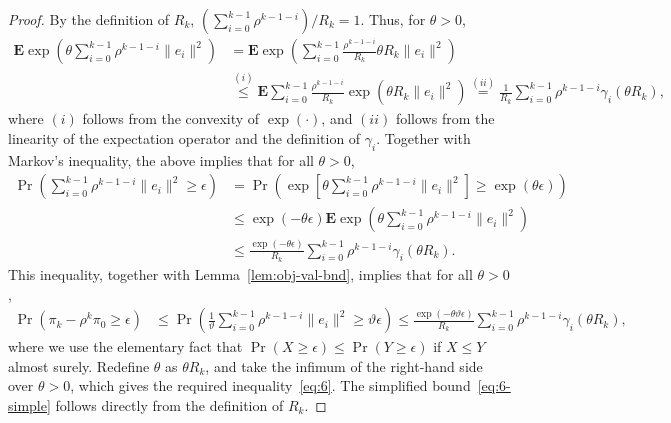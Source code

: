 \begin{proof}
  By the definition of $R_{k}$, $\left(\sum_{i=0}^{k-1}
    \rho^{k-1-i}\right)/{R_k}=1$. Thus, for $\theta>0$,
  \begin{align*}
    \mathbf{E}
        \exp\left(
              \theta\sum_{i=0}^{k-1}\rho^{k-1-i}\|e_i\|^2
            \right)
     &=
    \mathbf{E}
        \exp\left(
              \sum_{i=0}^{k-1}
              \frac{\rho^{k-1-i}}{R_k}\theta R_k\|e_i\|^2
            \right)
\\  &\overset{(i)}\le
    \mathbf{E}
        \sum_{i=0}^{k-1}\frac{\rho^{k-1-i}}{R_k}
        \exp(\theta R_k\|e_i\|^2)
 \overset{(ii)}=
    \frac{1}{R_k}\sum_{i=0}^{k-1}\rho^{k-1-i}\gamma_i(\theta R_k),
  \end{align*}
  where $(i)$ follows from the convexity of $\exp(\cdot)$, and $(ii)$
  follows from the linearity of the expectation operator and the
  definition of $\gamma_i$. Together with Markov's inequality, the above
  implies that for all $\theta>0$,
  \begin{align}
    \Pr\left(\sum_{i=0}^{k-1}\rho^{k-1-i}\|e_{i}\|^2\ge\epsilon \right)
    &=
    \Pr\left(
      \exp
      \left[
        \theta \sum_{i=0}^{k-1}\rho^{k-1-i}\|e_i\|^2
      \right]
      \ge
      \exp(\theta\epsilon)
    \right) \nonumber
\\ &\le
   \exp(-\theta\epsilon)
   \mathbf{E} \exp\left(
     \theta \sum_{i=0}^{k-1}\rho^{k-1-i}\|e_i\|^2
   \right) \nonumber
\\ &\le
   \frac{\exp(-\theta\epsilon)}{R_k}
   \sum_{i=0}^{k-1}\rho^{k-1-i}\gamma_i(\theta R_k).
   \label{eq:markov-application-sum}
  \end{align}
  This inequality, together with Lemma~\ref{lem:obj-val-bnd}, implies
  that for all $\theta>0$,
  \begin{align*}
    \Pr\left(\pi_k-\rho^k\pi_0\ge\epsilon\right)
    &\le
    \Pr
    \left(
      \frac1{\vartheta}\sum_{i=0}^{k-1}\rho^{k-1-i}\|e_i\|^2
      \ge \vartheta\epsilon
    \right) 
    \le
    \frac{\exp(-\theta \vartheta\epsilon)}{R_k}
    \sum_{i=0}^{k-1}\rho^{k-1-i}\gamma_i(\theta R_k),
  \end{align*}
  where we use the elementary fact that
  $\Pr(X\ge\epsilon)\le\Pr(Y\ge\epsilon)$ if $X\le Y$ almost
  surely. Redefine $\theta$ as $\theta R_k$, and take the infimum
  of the right-hand side over $\theta>0$, which gives the required
  inequality~\eqref{eq:6}. The simplified bound~\eqref{eq:6-simple}
  follows directly from the definition of $R_k$.
\end{proof}

